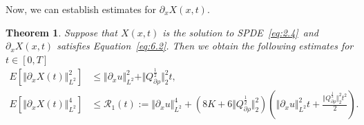 \documentclass[11pt]{article}
\numberwithin{equation}{section}%
\numberwithin{figure}{section}%
\newtheorem{theorem}{Theorem}[section]
\theoremstyle{remark}
\begin{document}
	Now, we can establish estimates for $\partial_{x}X(x,t)$.
	\begin{theorem}\label{thm:diffestima}
	Suppose that $X(x,t)$ is the solution to SPDE~\eqref{eq:2.4}~and $\partial_{x}X(x,t)$ satisfies Equation~\eqref{eq:6.2}. Then we obtain the following estimates for $t\in[0,T]$
		\begin{align*}
			E[\Vert\partial_{x} X(t)\Vert _{L^{2}}^{2}]
			&\leq \Vert\partial_{x} u\Vert _{L^{2}}^{2}+\Vert Q_{\partial\rho}^{\frac{1}{2}}\Vert^{2}_{2}t,\\
			E[\Vert \partial_{x}X(t)\Vert _{L^{2}}^{4}]
			&\leq\mathcal{R}_{1}(t):=\Vert\partial_{x} u\Vert _{L^{2}}^{4}+\left(8K+6\Vert Q_{\partial\rho}^{\frac{1}{2}}\Vert^{2}_{2}\right)\left(\Vert\partial_{x} u\Vert _{L^{2}}^{2}t+\frac{\Vert Q_{\partial\rho}^{\frac{1}{2}}\Vert^{2}_{2}t^{2}}{2}\right).
		\end{align*}
		
		
		
	\end{theorem}
	
\end{document}

